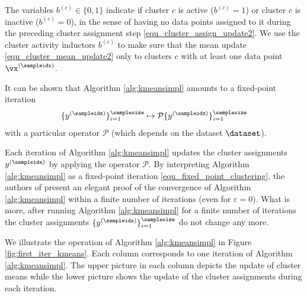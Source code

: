 \documentclass[12pt]{report}
\begin{document}
The variables $b^{(c)} \in \{0,1\}$ indicate if cluster $c$ is 
active ($b^{(c)}= 1$) or cluster $c$ is inactive ($b^{(c)}=0$), 
in the sense of having no data points assigned to it during 
the preceding cluster assignment step \eqref{equ_cluster_assign_update2}. 
We use the cluster activity inductors $b^{(c)}$ to make sure 
that the mean update \eqref{equ_cluster_mean_update2} only 
to clusters $c$ with at least one data point $\vx^{(\sampleidx)}$. 

It can be shown that Algorithm \ref{alg:kmeansimpl} amounts to 
a fixed-point iteration 
\begin{equation}
\label{equ_fixed_point_clustering}
\{ y^{(\sampleidx)} \}_{i=1}^{\samplesize} \mapsto \mathcal{P}  \{ y^{(\sampleidx)} \}_{i=1}^{\samplesize}
\end{equation}
with a particular operator $\mathcal{P}$ (which depends on 
the dataset $\dataset$). 

Each iteration of Algorithm \ref{alg:kmeansimpl} updates the cluster 
assignments $y^{(\sampleidx)}$ by applying the operator $\mathcal{P}$. 
By interpreting Algorithm \ref{alg:kmeansimpl} as a fixed-point iteration 
\eqref{equ_fixed_point_clustering}, the authors of \cite[Thm. 2]{Gray1980} 
present an elegant proof of the convergence of Algorithm \ref{alg:kmeansimpl} 
within a finite number of iterations (even for $\varepsilon = 0$). What is more, 
after running Algorithm \ref{alg:kmeansimpl} for a finite number of iterations 
the cluster assignments $\{ y^{(\sampleidx)} \}_{i=1}^{\samplesize}$ do 
not change any more.   

We illustrate the operation of Algorithm \ref{alg:kmeansimpl} in 
Figure \ref{fig:first_iter_kmeans}. Each column corresponds to 
one iteration of Algorithm \ref{alg:kmeansimpl}. The upper picture 
in each column depicts the update of cluster means while the 
lower picture shows the update of the cluster assignments 
during each iteration. 
\end{document}
